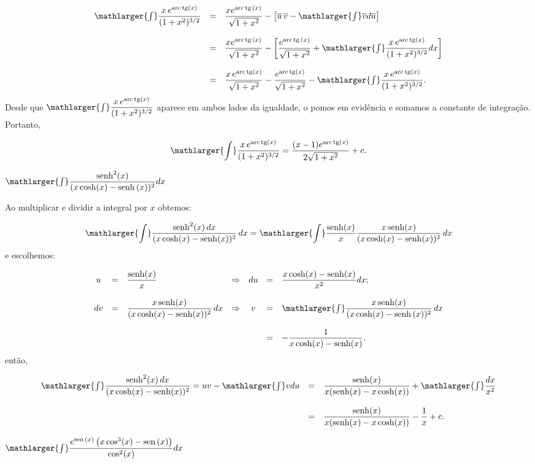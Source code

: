 \cleardoublepage\documentclass[../main.tex]{subfiles}
\begin{document}
\begin{exeresol}
\begin{compactenum}[a)]
\begin{solution}
\[ \begin{array}{rcl} \mathlarger{\int}\dfrac{x\,e^{{\rm arc\,tg} (x)}}{(1+x^2)^{3/2}} &= & \dfrac{x e^{{\rm arc\,tg\,} (x)}}{\sqrt{1+x^2}} -\left[\overline{u} \, \overline{v}-\mathlarger{\int} \overline{v} d\overline{u}\right] \\ \\ & =& \dfrac{x e^{{\rm arc\,tg\,} (x)}}{\sqrt{1+x^2}} - \left[ \dfrac{e^{{\rm arc\,tg\,} (x)}}{\sqrt{1+x^2}} + \mathlarger{\int}\dfrac{x\,e^{{\rm arc\,tg} (x)}}{(1+x^2)^{3/2}} dx \right]\\ \\ & =& \dfrac{x\, e^{{\rm arc\,tg} (x)}}{\sqrt{1+x^2}} - \dfrac{e^{{\rm arc\,tg} (x)}}{\sqrt{1+x^2}} - \mathlarger{\int}\dfrac{x\,e^{{\rm arc\,tg} (x)}}{(1+x^2)^{3/2}} . \end{array} \]
Desde que \(\mathlarger{\int}\dfrac{x\,e^{{\rm arc\,tg} (x)}}{(1+x^2)^{3/2}}\) aparece em ambos lados da igualdade, o pomos em evidência e somamos a constante de integração. Portanto,

\[ \mathlarger{\int}\dfrac{x\,e^{{\rm arc\,tg} (x)}}{(1+x^2)^{3/2}} = \dfrac{(x-1) e^{{\rm arc\,tg} (x)}}{2\sqrt{1+x^2}} +c. \]
 \end{solution}
 \item \(\mathlarger{\int}\dfrac{{\rm senh}^2(x)}{(x \cosh(x)- {\rm senh}\,(x))^2} dx\)
 
 \begin{solution}
 Ao multiplicar e dividir a integral por \(x\) obtemos:

\[ \mathlarger{\int}\dfrac{{\rm senh}^2(x)\,dx}{(x \cosh(x)- {\rm senh}(x))^2}\, dx = \mathlarger{\int}\dfrac{{\rm senh}(x)}{x} \dfrac{x\,{\rm senh}(x)}{(x \cosh(x)- {\rm senh}(x))^2} \,dx \]
e escolhemos:

\[ \begin{array}{cclcccl} u &=& \dfrac{{\rm senh}(x)}{x}&\Rightarrow&du &=& \dfrac{x \cosh(x)- {\rm senh}(x)}{x^2}dx;\\ \\ dv &=& \dfrac{x\,{\rm senh}(x)}{(x \cosh(x)- {\rm senh}(x))^2}\,dx &\Rightarrow&v &=& \mathlarger{\int} \dfrac{x\,{\rm senh}(x)}{(x \cosh(x)- {\rm senh}\,(x))^2}\,dx \\ \\ &&&&&=&-\dfrac{1}{x \cosh(x)- {\rm senh}(x)}. \end{array} \]
então,

\[ \begin{array}{rcl} \mathlarger{\int}\dfrac{{\rm senh}^2(x)\,dx}{(x \cosh(x)- {\rm senh}(x))^2} = uv-\mathlarger{\int} v du &=& \dfrac{{\rm senh}(x)}{x({\rm senh}(x)- x \cosh(x))} + \mathlarger{\int}\dfrac{dx}{x^2}\\ \\ &=& \dfrac{{\rm senh}(x)}{x({\rm senh}(x)- x \cosh(x))} -\dfrac{1}{x}+c. \end{array} \]
 \end{solution}
 \item \(\mathlarger{\int}\dfrac{ e^{\sen(x)}\left(x \cos^3(x) - \sen(x)\right)}{\cos^2 (x)} dx\)\\
 

\end{compactenum}
\end{exeresol}
\end{document}
